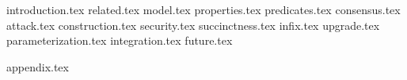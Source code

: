 {introduction.tex}
{related.tex}
{model.tex}
{properties.tex}
{predicates.tex}
{consensus.tex}
{attack.tex}
{construction.tex}
{security.tex}
{succinctness.tex}
{infix.tex}
{upgrade.tex}
{parameterization.tex}
{integration.tex}
{future.tex}

\iftwocolumn
\newpage
\appendix
{appendix.tex}
\fi
